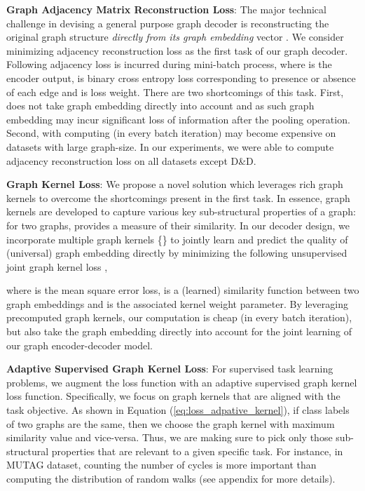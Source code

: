 \documentclass{article}
\begin{document}
\noindent \textbf{Graph Adjacency Matrix Reconstruction Loss}: The major technical challenge in devising a general purpose graph decoder is reconstructing the original graph structure {\em directly from its graph embedding} vector . 
We consider minimizing adjacency reconstruction loss   as the first task of our graph decoder. Following adjacency loss   is incurred during mini-batch process, 
where  is the encoder output,  is binary cross entropy loss corresponding to presence or absence of each edge and  is loss weight.  There are two shortcomings of this task. First,    does not take  graph embedding  directly into account and as such   graph embedding may incur significant loss of information after the pooling operation. Second,  with  computing  (in every batch iteration) may become   expensive on datasets with large graph-size. In our experiments,  we were able to compute adjacency  reconstruction loss on all  datasets except D\&D.








\noindent \textbf{Graph Kernel Loss}: We propose a novel solution which leverages rich graph kernels to overcome the shortcomings present in  the  first task. In essence, graph kernels are developed to capture various key sub-structural properties of a graph: for two graphs,  provides a measure of their similarity. 
In our decoder design, we incorporate multiple graph kernels \{\}  to jointly learn and predict the quality of (universal) graph 
embedding  directly by minimizing the following unsupervised  joint graph kernel loss  , 

\vspace{-1.5em}

\vspace{-1.5em}

where  is the mean square error loss,  is a (learned) similarity function between two graph embeddings and   is the associated   kernel weight parameter.  By leveraging precomputed graph kernels, our computation is cheap (in every batch iteration), but also  take the graph embedding   directly into account for the joint learning of our graph encoder-decoder model.  




\noindent \textbf{Adaptive Supervised Graph Kernel Loss}:  For supervised task learning problems, we augment the   loss function   with an adaptive supervised graph kernel loss function. Specifically, we focus on graph kernels that are aligned with the task objective. As shown in Equation (\ref{eq:loss_adpative_kernel}), if class labels of two graphs are the same, then we choose the graph kernel with maximum similarity value and vice-versa. Thus, we are making sure to pick only those sub-structural properties that are relevant to a given specific task. For instance, in MUTAG dataset,  counting the number of cycles is more important than computing the  distribution of random walks (see appendix for more details).
\end{document}
